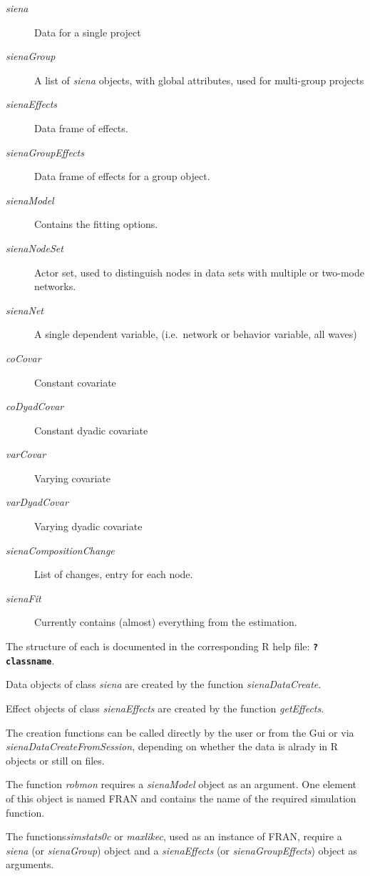 \documentclass[12pt,a4paper]{article}
\renewcommand{\=}{\,=\,}
\newcommand{\+}{\,+\,}
\newcommand{\nm}[1]{\textsf{ #1}}
\newcommand{\nnm}[1]{\textsf{\textit{#1}}}
\newcommand{\sfn}[1]{\textbf{\texttt{#1}}}
\newcommand{\R}{{\sf R }}
\begin{document}
\begin{description}
\item[\nnm{siena}] Data for a single project
\item[\nnm{sienaGroup}] A list of \nnm{siena} objects, with global attributes,
  used for multi-group projects
\item[\nnm{sienaEffects}] Data frame of effects.
\item[\nnm{sienaGroupEffects}] Data frame of effects for a group object.
\item[\nnm{sienaModel}] Contains the fitting options.
\item[\nnm{sienaNodeSet}] Actor set, used to distinguish nodes in data sets with
  multiple or two-mode networks.
\item[\nnm{sienaNet}] A single dependent variable, (i.e.\ network or behavior
  variable, all waves)
\item[\nnm{coCovar}] Constant covariate
\item[\nnm{coDyadCovar}] Constant dyadic covariate
\item[\nnm{varCovar}] Varying covariate
\item[\nnm{varDyadCovar}] Varying dyadic covariate
\item[\nnm{sienaCompositionChange}] List of changes, entry for each node.
\item[\nnm{sienaFit}] Currently contains (almost) everything from the
  estimation.
\end{description}

The structure of each is documented in the corresponding \R help file:
\sfn{?classname}.

Data objects of class \nnm{siena} are created by the function
\nnm{sienaDataCreate}.

Effect objects of class \nnm{sienaEffects} are created by the function
\nnm{getEffects}.

The creation functions can be called directly by the user or from the Gui or via
\nnm{sienaDataCreateFromSession}, depending on whether the data is alrady in \R
objects or still on files.

The function \nnm{robmon} requires a \nnm{sienaModel} object
as an argument. One element of this object is named \nm{FRAN} and contains the
name of the required simulation function.

The functions\nnm{simstats0c} or \nnm{maxlikec}, used as an instance of
\nm{FRAN}, require a \nnm{siena} (or \nnm{sienaGroup}) object and a
\nnm{sienaEffects} (or \nnm{sienaGroupEffects}) object as arguments.
\end{document}

